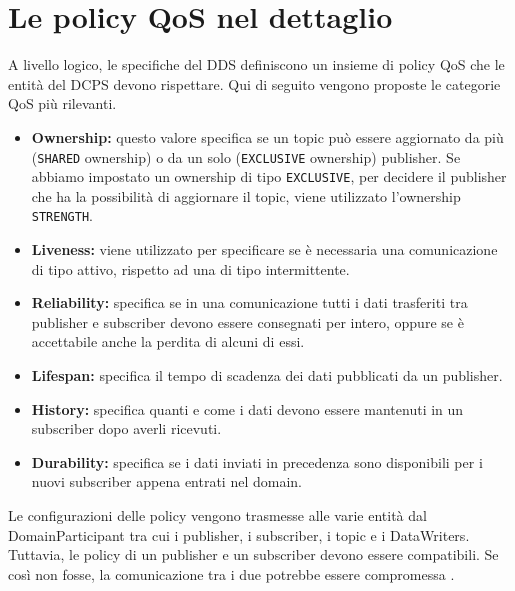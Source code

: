 \section{Le policy QoS nel dettaglio}
A livello logico, le specifiche del DDS
definiscono un insieme di policy QoS
che le entità del DCPS devono rispettare. Qui di seguito vengono
proposte le categorie QoS più rilevanti.
\begin{itemize}
    \item \textbf{Ownership:} questo valore specifica se un topic
    può essere aggiornato da più 
    (\texttt{SHARED} ownership) o da un solo (\texttt{EXCLUSIVE} ownership) publisher.
    Se abbiamo impostato un ownership di tipo \texttt{EXCLUSIVE}, per decidere il 
    publisher che ha la possibilità di aggiornare il topic, viene 
    utilizzato l'ownership \texttt{STRENGTH}.
    \item \textbf{Liveness:} viene utilizzato per specificare se è necessaria
    una comunicazione di tipo attivo, rispetto ad una di tipo 
    intermittente.
    \item \textbf{Reliability:} specifica se in una comunicazione tutti i dati
    trasferiti tra publisher e subscriber devono essere consegnati
    per intero, oppure
    se è accettabile anche la perdita di alcuni di essi.
    \item \textbf{Lifespan:} specifica il tempo di scadenza dei dati pubblicati da 
    un publisher.
    \item \textbf{History:} specifica quanti e come i dati devono essere 
    mantenuti in un 
    subscriber dopo averli ricevuti.
    \item \textbf{Durability:} specifica se i dati inviati in precedenza sono
    disponibili per i nuovi subscriber appena entrati nel domain.
\end{itemize}
Le configurazioni 
delle policy vengono trasmesse alle varie entità dal DomainParticipant
tra cui i publisher, i subscriber, i topic e i DataWriters.
Tuttavia, le policy di un publisher e un subscriber devono essere compatibili.
Se così non fosse, la comunicazione tra i due potrebbe essere compromessa
\cite{Michaud2017Apr}.
\label{Le policy QoS nel dettaglio}


